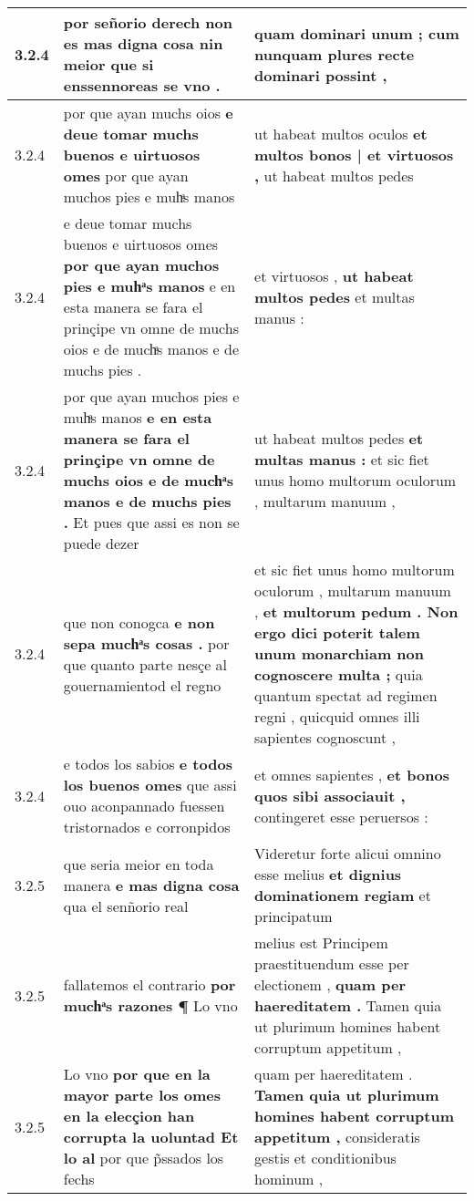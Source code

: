 \begin{tabular}{|p{1cm}|p{6.5cm}|p{6.5cm}|}
3.2.4 & por señorio derech \textbf{ non es mas digna cosa nin meior } que si enssennoreas se vno . & quam dominari unum ; \textbf{ cum nunquam plures } recte dominari possint , \\\hline
3.2.4 & por que ayan muchs oios \textbf{ e deue tomar muchs buenos e uirtuosos omes } por que ayan muchos pies e muhͣs manos & ut habeat multos oculos \textbf{ et multos bonos | et virtuosos , } ut habeat multos pedes \\\hline
3.2.4 & e deue tomar muchs buenos e uirtuosos omes \textbf{ por que ayan muchos pies e muhͣs manos } e en esta manera se fara el prinçipe vn omne de muchs oios e de muchͣs manos e de muchs pies . & et virtuosos , \textbf{ ut habeat multos pedes } et multas manus : \\\hline
3.2.4 & por que ayan muchos pies e muhͣs manos \textbf{ e en esta manera se fara el prinçipe vn omne de muchs oios e de muchͣs manos e de muchs pies . } Et pues que assi es non se puede dezer & ut habeat multos pedes \textbf{ et multas manus : } et sic fiet unus homo multorum oculorum , multarum manuum , \\\hline
3.2.4 & que non conogca \textbf{ e non sepa muchͣs cosas . } por que quanto parte nesçe al gouernamientod el regno & et sic fiet unus homo multorum oculorum , multarum manuum , \textbf{ et multorum pedum . Non ergo dici poterit talem unum monarchiam non cognoscere multa ; } quia quantum spectat ad regimen regni , quicquid omnes illi sapientes cognoscunt , \\\hline
3.2.4 & e todos los sabios \textbf{ e todos los buenos omes } que assi ouo aconpannado fuessen tristornados e corronpidos & et omnes sapientes , \textbf{ et bonos quos sibi associauit , } contingeret esse peruersos : \\\hline
3.2.5 & que seria meior en toda manera \textbf{ e mas digna cosa } qua el senñorio real & Videretur forte alicui omnino esse melius \textbf{ et dignius dominationem regiam } et principatum \\\hline
3.2.5 & fallatemos el contrario \textbf{ por muchͣs razones ¶ } Lo vno & melius est Principem praestituendum esse per electionem , \textbf{ quam per haereditatem . } Tamen quia ut plurimum homines habent corruptum appetitum , \\\hline
3.2.5 & Lo vno \textbf{ por que en la mayor parte los omes en la elecçion han corrupta la uoluntad Et lo al } por que p̃ssados los fechs & quam per haereditatem . \textbf{ Tamen quia ut plurimum homines habent corruptum appetitum , } consideratis gestis et conditionibus hominum , \\\hline

\end{tabular}
